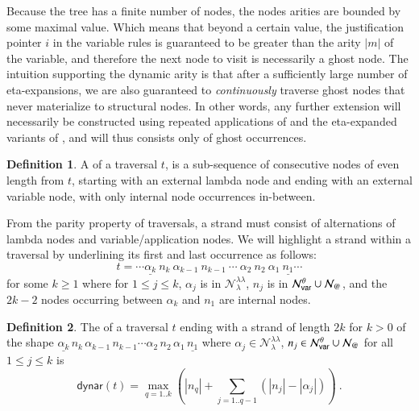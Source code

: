 \documentclass{elsarticle}
\makeatletter
\theoremstyle{plain}
\theoremstyle{definition}
\newtheorem{definition}{Definition}[section]
\theoremstyle{remark}
\newcommand\Nodes{\mathcal{N}}%
\newcommand\NodesVar{\Nodes_{\sf var}}%
\newcommand\NodesLmd{\Nodes_\lambda}%
\newcommand\NodesApp{\Nodes_@}%
\newcommand{\ghostlmd}{{\lambda\!\!\lambda}}
\newcommand{\ghostvar}{\theta}
\newcommand\ExtendedNodesVar{\NodesVar^\ghostvar}
\newcommand\ExtendedNodesLmd{\NodesLmd^\ghostlmd}
\newcommand\dynar{\textsf{dynar}} %
\makeatother
\begin{document}
Because the tree has a finite number of nodes, the nodes arities are bounded by some maximal value. Which means that beyond a certain value, the
justification pointer $i$ in the variable rules  is guaranteed to be greater than the arity $|m|$ of the variable, and therefore the next node to visit is necessarily a ghost node. The intuition supporting the dynamic arity is that after a sufficiently large number of eta-expansions, we are also guaranteed to \emph{continuously} traverse ghost nodes that never materialize to structural nodes. In other words, any further extension will necessarily be constructed using repeated applications of \rulenamet{Lam^\ghostvar} and the eta-expanded variants of , and will thus consists only of ghost occurrences.


\begin{definition}
\label{ref:strand}
A  of a traversal $t$, is a sub-sequence of consecutive nodes of even length from $t$, starting with an external lambda node and ending with an external variable node, with only internal node occurrences in-between.
\end{definition}

From the parity property of traversals, a strand must consist of alternations of lambda nodes and variable/application nodes. We will highlight a strand within a traversal by underlining its first and last occurrence as follows:
$$ t = \cdots \underline{\alpha_k}\ n_k\ \alpha_{k-1}\ n_{k-1}\ \cdots\ \alpha_2\ n_2\ \alpha_1\ \underline{n_1} \cdots $$
for some $k\geq 1$ where for $1 \leq j \leq k$, $\alpha_j$ is in $\ExtendedNodesLmd$, $n_j$ is in $\ExtendedNodesVar\union\NodesApp$, and the $2k-2$ nodes occurring between $\alpha_k$ and $n_1$ are internal nodes.

\begin{definition} %
\label{dfn:dynamic-arity}
The  of a traversal $t$ ending with a strand
 of length $2k$ for $k>0$ of the shape $\underline{\alpha_k}\,n_k\,\alpha_{k-1}\,n_{k-1}\cdots \alpha_2\,n_2\, \alpha_1\,\underline{n_1}$ where $\alpha_j \in \ExtendedNodesLmd$, $n_j \in \ExtendedNodesVar\union\NodesApp$ for all $1\leq j\leq k$ is
$$
\dynar(t)
  = \max_{q=1..k} \left( |n_q| + \sum_{j=1..q-1} (|n_j|-|\alpha_j|) \right) \ .
$$
\end{definition}
\end{document}
